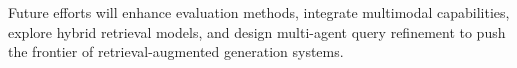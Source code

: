 \documentclass{scrartcl}
\begin{document}
Future efforts will enhance evaluation methods, integrate multimodal capabilities, explore hybrid retrieval models, and design multi-agent query refinement to push the frontier of retrieval-augmented generation systems.




\appendix

\end{document}
